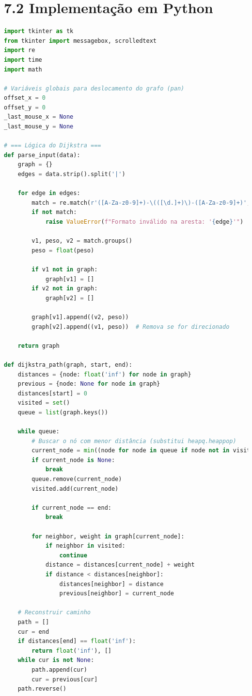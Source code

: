 \documentclass[12pt,a4paper]{report}
\begin{document}
\section*{7.2 Implementação em Python}
\begin{lstlisting}[language=Python, caption=Dijkstra em Python (parcial)]
import tkinter as tk
from tkinter import messagebox, scrolledtext
import re
import time
import math

# Variáveis globais para deslocamento do grafo (pan)
offset_x = 0
offset_y = 0
_last_mouse_x = None
_last_mouse_y = None

# === Lógica do Dijkstra ===
def parse_input(data):
    graph = {}
    edges = data.strip().split('|')

    for edge in edges:
        match = re.match(r'([A-Za-z0-9]+)-\(([\d.]+)\)-([A-Za-z0-9]+)', edge.strip())
        if not match:
            raise ValueError(f"Formato inválido na aresta: '{edge}'")

        v1, peso, v2 = match.groups()
        peso = float(peso)

        if v1 not in graph:
            graph[v1] = []
        if v2 not in graph:
            graph[v2] = []

        graph[v1].append((v2, peso))
        graph[v2].append((v1, peso))  # Remova se for direcionado

    return graph

def dijkstra_path(graph, start, end):
    distances = {node: float('inf') for node in graph}
    previous = {node: None for node in graph}
    distances[start] = 0
    visited = set()
    queue = list(graph.keys())

    while queue:
        # Buscar o nó com menor distância (substitui heapq.heappop)
        current_node = min((node for node in queue if node not in visited), key=lambda node: distances[node], default=None)
        if current_node is None:
            break
        queue.remove(current_node)
        visited.add(current_node)

        if current_node == end:
            break

        for neighbor, weight in graph[current_node]:
            if neighbor in visited:
                continue
            distance = distances[current_node] + weight
            if distance < distances[neighbor]:
                distances[neighbor] = distance
                previous[neighbor] = current_node

    # Reconstruir caminho
    path = []
    cur = end
    if distances[end] == float('inf'):
        return float('inf'), []
    while cur is not None:
        path.append(cur)
        cur = previous[cur]
    path.reverse()


\end{lstlisting}
\end{document}
